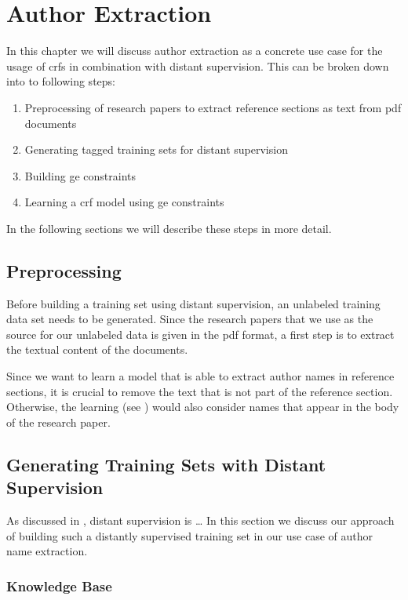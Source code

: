\chapter{Author Extraction}\label{cha:author-extraction}

In this chapter we will discuss author extraction as a concrete use case for the usage of \glspl{crf} in combination with \gls{distant supervision}.
This can be broken down into to following steps:
\begin{enumerate}
  \item Preprocessing of research papers to extract reference sections as text from \gls{pdf} documents
  \item Generating tagged training sets for distant supervision
  \item Building \acrfull{ge} constraints
  \item Learning a \gls{crf} model using \gls{ge} constraints
\end{enumerate}
In the following sections we will describe these steps in more detail.

\section{Preprocessing}\label{sec:ae-preprocessing}

Before building a training set using \gls{distant supervision}, an unlabeled training data set needs to be generated.
Since the research papers that we use as the source for our unlabeled data is given in the \gls{pdf} format, a first step is to extract the textual content of the documents.

Since we want to learn a model that is able to extract author names in reference sections, it is crucial to remove the text that is not part of the reference section.
Otherwise, the learning (see ) would also consider names that appear in the body of the research paper.

\section{Generating Training Sets with Distant Supervision}\label{sec:ae-distant-supervision}

As discussed in , distant supervision is \dots
In this section we discuss our approach of building such a distantly supervised training set in our use case of author name extraction.

\subsection{Knowledge Base}\label{subsec:ae-knowledge-base}

